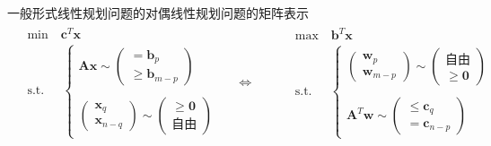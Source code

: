 \documentclass[lang = cn, scheme = chinese, thmcnt = section]{elegantbook}
\newcommand{\bs}{\boldsymbol}          %
\begin{document}
\begin{definition}{一般形式线性规划问题的对偶线性规划问题的矩阵表示}
	\begin{align*}
		\begin{aligned}
			& \text{min}  \quad \bs{c}^T\bs{x}\\
			& \text{s.t.} \;\, \quad \begin{cases}
				\bs{Ax}\sim\begin{pmatrix}
					= \bs{b}_p\\
					\ge \bs{b}_{m-p}
				\end{pmatrix}\\
				\\
				\begin{pmatrix}
					\bs{x}_q\\
					\bs{x}_{n-q}
				\end{pmatrix} \sim\begin{pmatrix}
					\ge \bs{0}\\
					\text{自由}
				\end{pmatrix}
			\end{cases}
		\end{aligned}
		\quad\iff\qquad
		\begin{aligned}
			& \text{max}  \quad \bs{b}^T\bs{x}\\
			& \text{s.t.} \;\, \quad \begin{cases}
				\begin{pmatrix}
					\bs{w}_p\\
					\bs{w}_{m-p}
				\end{pmatrix} \sim\begin{pmatrix}
					\text{自由}\\
					\ge \bs{0}
				\end{pmatrix}\\
				\\
				\bs{A}^T\bs{w}\sim\begin{pmatrix}
					\le \bs{c}_q\\
					= \bs{c}_{n-p}
				\end{pmatrix}
			\end{cases}
		\end{aligned}
	\end{align*}
\end{definition}
\end{document}
